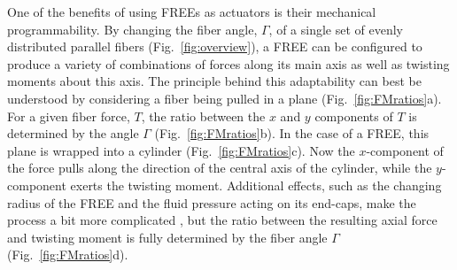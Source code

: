 One of the benefits of using FREEs as actuators is their mechanical programmability.
By changing the fiber angle, $\Gamma$, of a single set of evenly distributed parallel fibers (Fig.~\ref{fig:overview}), a FREE can be configured to produce a variety of combinations of forces along its main axis as well as twisting moments about this axis.
The principle behind this adaptability can best be understood by considering a fiber being pulled in a plane (Fig.~\ref{fig:FMratios}a).
For a given fiber force, $T$, the ratio between the $x$ and $y$ components of $T$ is determined by the angle $\Gamma$ (Fig.~\ref{fig:FMratios}b). 
In the case of a FREE, this plane is wrapped into a cylinder (Fig.~\ref{fig:FMratios}c). 
Now the $x$-component of the force pulls along the direction of the central axis of the cylinder, while the $y$-component exerts the twisting moment.
Additional effects, such as the changing radius of the FREE and the fluid pressure acting on its end-caps, make the process a bit more complicated \cite{bruder2017model}, but the ratio between the resulting axial force and twisting moment is fully determined by the fiber angle $\Gamma$ (Fig.~\ref{fig:FMratios}d).


